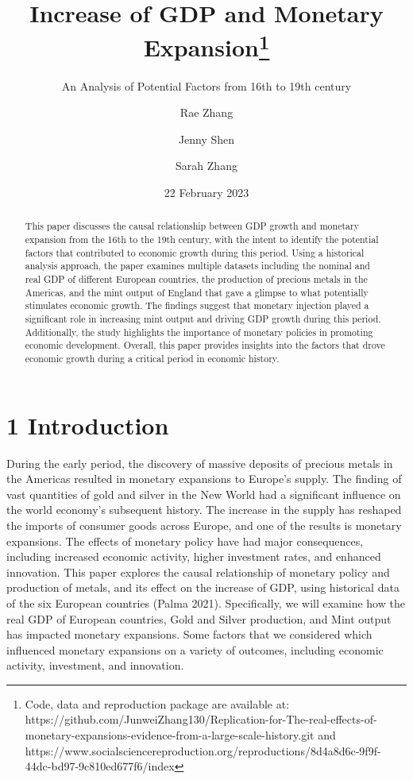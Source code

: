 \documentclass[
  letterpaper,
  DIV=11,
  numbers=noendperiod]{scrartcl}
\title{Increase of GDP and Monetary Expansion\thanks{Code, data and
reproduction package are available at:
https://github.com/JunweiZhang130/Replication-for-The-real-effects-of-monetary-expansions-evidence-from-a-large-scale-history.git
and
https://www.socialsciencereproduction.org/reproductions/8d4a8d6c-9f9f-44dc-bd97-9c810ed677f6/index}}
\subtitle{An Analysis of Potential Factors from 16th to 19th century}
\author{Rae Zhang \and Jenny Shen \and Sarah Zhang}
\date{22 February 2023}
\begin{document}
\maketitle
\begin{abstract}
This paper discusses the causal relationship between GDP growth and
monetary expansion from the 16th to the 19th century, with the intent to
identify the potential factors that contributed to economic growth
during this period. Using a historical analysis approach, the paper
examines multiple datasets including the nominal and real GDP of
different European countries, the production of precious metals in the
Americas, and the mint output of England that gave a glimpse to what
potentially stimulates economic growth. The findings suggest that
monetary injection played a significant role in increasing mint output
and driving GDP growth during this period. Additionally, the study
highlights the importance of monetary policies in promoting economic
development. Overall, this paper provides insights into the factors that
drove economic growth during a critical period in economic history.
\end{abstract}
\ifdefined\Shaded\renewenvironment{Shaded}{\begin{tcolorbox}[boxrule=0pt, frame hidden, enhanced, sharp corners, interior hidden, breakable, borderline west={3pt}{0pt}{shadecolor}]}{\end{tcolorbox}}\fi

\newpage

\hypertarget{introduction}{%
\section{1 Introduction}\label{introduction}}

During the early period, the discovery of massive deposits of precious
metals in the Americas resulted in monetary expansions to Europe's
supply. The finding of vast quantities of gold and silver in the New
World had a significant influence on the world economy's subsequent
history. The increase in the supply has reshaped the imports of consumer
goods across Europe, and one of the results is monetary expansions. The
effects of monetary policy have had major consequences, including
increased economic activity, higher investment rates, and enhanced
innovation. This paper explores the causal relationship of monetary
policy and production of metals, and its effect on the increase of GDP,
using historical data of the six European countries (Palma 2021).
Specifically, we will examine how the real GDP of European countries,
Gold and Silver production, and Mint output has impacted monetary
expansions. Some factors that we considered which influenced monetary
expansions on a variety of outcomes, including economic activity,
investment, and innovation.
\end{document}
